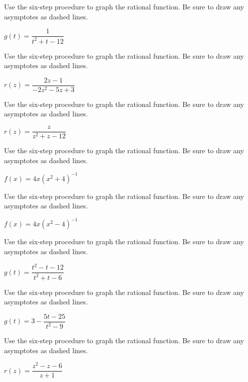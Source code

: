 \documentclass{ximera}
\begin{document}
\begin{problem}
Use the six-step procedure
to graph the rational function.  Be sure to draw any asymptotes as dashed lines.

$g(t) = \dfrac{1}{t^{2} + t - 12}$
\end{problem}

\begin{problem}
Use the six-step procedure
to graph the rational function.  Be sure to draw any asymptotes as dashed lines.

$r(z) = \dfrac{2z - 1}{-2z^{2} - 5z + 3}$
\end{problem} 

\begin{problem}
Use the six-step procedure
to graph the rational function.  Be sure to draw any asymptotes as dashed lines.

$r(z) = \dfrac{z}{z^{2} + z - 12}$
\end{problem}  

\begin{problem}
Use the six-step procedure
to graph the rational function.  Be sure to draw any asymptotes as dashed lines.

$f(x) = 4x(x^2+4)^{-1}$
\end{problem} 

\begin{problem}
Use the six-step procedure
to graph the rational function.  Be sure to draw any asymptotes as dashed lines.

$f(x) = 4x(x^2-4)^{-1}$
\end{problem} 

\begin{problem}
Use the six-step procedure
to graph the rational function.  Be sure to draw any asymptotes as dashed lines.

$g(t) = \dfrac{t^2-t-12}{t^2+t-6}$
\end{problem} 

\begin{problem}
Use the six-step procedure
to graph the rational function.  Be sure to draw any asymptotes as dashed lines.

$g(t) = 3- \dfrac{5t-25}{t^2-9}$
\end{problem} 

\begin{problem}
Use the six-step procedure
to graph the rational function.  Be sure to draw any asymptotes as dashed lines.

$r(z) = \dfrac{z^2-z-6}{z+1}$
\end{problem}  
\end{document}
